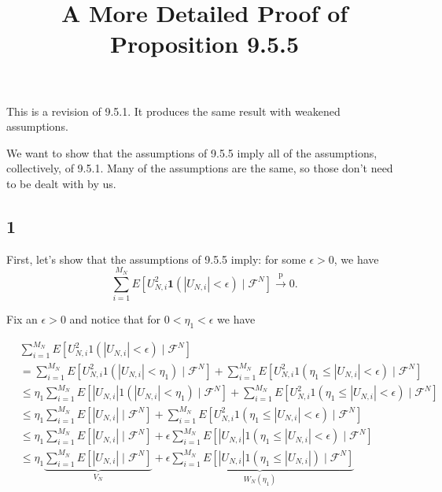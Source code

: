 \documentclass{article}
\title{A More Detailed Proof of Proposition 9.5.5}
\begin{document}
\maketitle


This is a revision of 9.5.1. It produces the same result with weakened assumptions. 

We want to show that the assumptions of 9.5.5 imply all of the assumptions, collectively, of 9.5.1. Many of the assumptions are the same, so those don't need to be dealt with by us.

\subsection*{1}

First, let's show that the assumptions of 9.5.5 imply: for some $\epsilon > 0$, we have
$$
\sum_{i=1}^{M_N}E[U_{N,i}^2 \mathbf{1}( |U_{N,i}| < \epsilon) \mid \mathcal{F}^N ] \overset{\text{p}}{\to} 0.
$$

Fix an $\epsilon > 0$ and notice that for $0 < \eta_1 < \epsilon$ we have

\begin{align*}
&\sum_{i=1}^{M_N} E\left[ U^2_{N,i}1( |U_{N,i}| < \epsilon ) \mid \mathcal{F}^N \right] \\
&= \sum_{i=1}^{M_N} E\left[ U^2_{N,i}1( |U_{N,i}| < \eta_1 ) \mid \mathcal{F}^N \right] +  \sum_{i=1}^{M_N} E\left[ U^2_{N,i}1(\eta_1 \le  |U_{N,i}| < \epsilon ) \mid \mathcal{F}^N \right] \\
&\le \eta_1 \sum_{i=1}^{M_N} E\left[ |U_{N,i} |1( |U_{N,i}| < \eta_1 ) \mid \mathcal{F}^N \right] +  \sum_{i=1}^{M_N} E\left[ U^2_{N,i}1(\eta_1 \le  |U_{N,i}| < \epsilon ) \mid \mathcal{F}^N \right] \tag{1} \\
&\le \eta_1 \sum_{i=1}^{M_N} E\left[ |U_{N,i} |\mid \mathcal{F}^N \right] +  \sum_{i=1}^{M_N} E\left[ U^2_{N,i}1(\eta_1 \le  |U_{N,i}| < \epsilon ) \mid \mathcal{F}^N \right] \tag{more space} \\
&\le \eta_1 \sum_{i=1}^{M_N} E\left[ |U_{N,i} |\mid \mathcal{F}^N \right] +  \epsilon \sum_{i=1}^{M_N} E\left[ |U_{N,i}|1(\eta_1 \le  |U_{N,i}| < \epsilon ) \mid \mathcal{F}^N \right] \tag{2} \\
&\le \eta_1 \underbrace{\sum_{i=1}^{M_N} E\left[ |U_{N,i} |\mid \mathcal{F}^N \right]}_{V_N} +  \underbrace{\epsilon \sum_{i=1}^{M_N} E\left[ |U_{N,i}|1(\eta_1 \le  |U_{N,i}| ) \mid \mathcal{F}^N \right]}_{W_N(\eta_1)} \tag{more space}
\end{align*}
\end{document}
